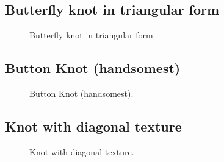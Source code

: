 \subsection{Butterfly knot in triangular form}

\begin{figure}[H]\centering
	\begin{minipage}{1\linewidth}
		\begin{center}
			\tcbox[enhanced jigsaw,colframe=black,opacityframe=0.5,opacityback=0.5]
			{\centering{}}
		\end{center}
	\end{minipage}
\caption{Butterfly knot in triangular form.}
\label{ris:Triangular_Butterfly_knot}
\end{figure}

\subsection{Button Knot (handsomest)}

\begin{figure}[H]\centering
	\begin{minipage}{1\linewidth}
		\begin{center}
			\tcbox[enhanced jigsaw,colframe=black,opacityframe=0.5,opacityback=0.5]
			{\centering{}}
		\end{center}
	\end{minipage}
\caption{Button Knot (handsomest).}
\label{ris:Button_Knot}
\end{figure}

\subsection{Knot with diagonal texture}

\begin{figure}[H]\centering
	\begin{minipage}{1\linewidth}
		\begin{center}
			\tcbox[enhanced jigsaw,colframe=black,opacityframe=0.5,opacityback=0.5]
			{\centering{}}
		\end{center}
	\end{minipage}
\caption{Knot with diagonal texture.}
\label{ris:Knot_with_diagonal_texture}
\end{figure}


